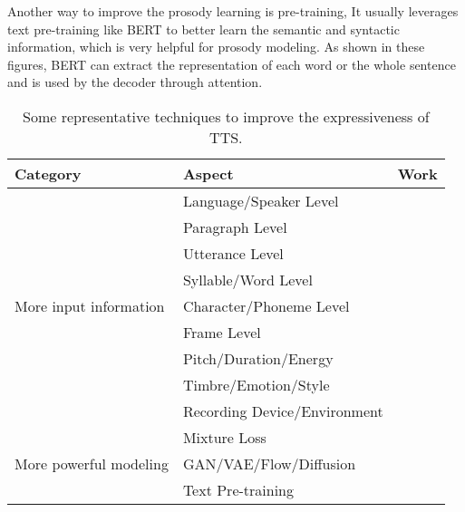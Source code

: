 \documentclass{article}
\begin{document}
Another way to improve the prosody learning is pre-training, It usually leverages text pre-training like BERT to better learn the semantic and syntactic information, which is very helpful for prosody modeling. As shown in these figures, BERT can extract the representation of each word or the whole sentence and is used by the decoder through attention. 

\begin{table}[h!]
\small
	\caption{Some representative techniques to improve the expressiveness of TTS.}
	\centering
	\begin{tabular}{l | l |  l }
		\toprule
		Category & Aspect & Work  \\
		\midrule
		\multirow{9}{*}{More input information} & Language/Speaker Level&  \cite{zhang2019learning,nekvinda2020one,chen2020multispeech} \\
	                                            & Paragraph Level & \cite{xu2020improving,aubin2019improving}\\ 
	                                            & Utterance Level &  \cite{wang2018style,skerry2018towards,jia2018transfer,stanton2018predicting}\\
	                                            & Syllable/Word Level & \cite{sun2020fully} \\
	                                            & Character/Phoneme Level & \cite{sun2020generating,zeng2020prosody,sun2020fully}\\
	                                            & Frame Level & \cite{zhang2020denoising,choi2020attentron}\\
	                                            \cmidrule{2-3}
	                                            & Pitch/Duration/Energy & \cite{ren2019fastspeech,ren2021fastspeech,lancucki2020fastpitch}\\
	                                            & Timbre/Emotion/Style &  \cite{bian2019multi,huybrechts2020low,li2021controllable} \\
	                                            & Recording Device/Environment & \cite{hsu2019disentangling,chen2021adaspeech,zhang2020denoising}\\
	    \midrule
		\multirow{3}{*}{More powerful modeling} & Mixture Loss & \cite{oord2018parallel} \\
		                                        & GAN/VAE/Flow/Diffusion & \cite{hsu2018hierarchical,zhang2019learningb,habib2019semi,lee2020multi,valle2020flowtron,kong2020diffwave} \\
		                                        & Text Pre-training & \cite{fang2019towards,hayashi2019pre,xiao2020improving} \\
		\bottomrule
	\end{tabular}
	\label{tab_expressiveness}
\end{table}
\fi
\end{document}
